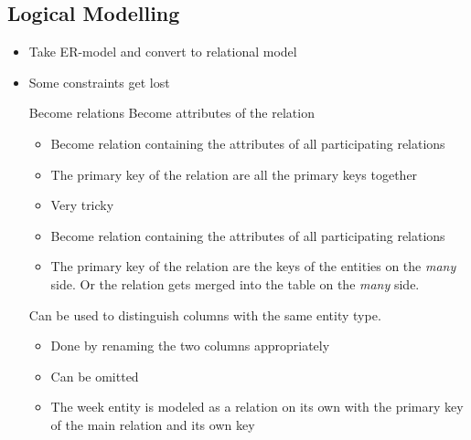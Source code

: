 \subsection{Logical Modelling}
\begin{itemize}
    \item Take ER-model and convert to relational model
    \item Some constraints get lost
        \begin{enumerate}
             Become relations
             Become attributes of the relation
                \begin{description}
                        \begin{itemize}
                            \item Become relation containing the attributes of all participating relations
                            \item The primary key of the relation are all the primary keys together
                        \end{itemize}
                        \begin{itemize}
                            \item Very tricky
                            \item Become relation containing the attributes of all participating relations
                            \item The primary key of the relation are the keys of the entities on the \textit{many} side. Or the relation gets merged into the table on the \textit{many} side.
                        \end{itemize}
                     Can be used to distinguish columns with the same entity type.
                        \begin{itemize}
                            \item Done by renaming the two columns appropriately
                        \end{itemize}
                \end{description}
                \begin{itemize}
                    \item Can be omitted
                    \item The week entity is modeled as a relation on its own with the primary key of the main relation and its own key

\end{itemize}
\end{enumerate}
\end{itemize}

